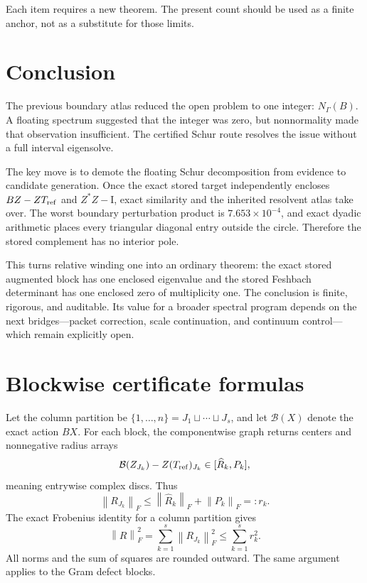\documentclass[11pt]{article}
\theoremstyle{definition}
\theoremstyle{remark}
\newcommand{\Id}{\mathrm I}
\newcommand{\norm}[1]{\left\lVert#1\right\rVert}
\newcommand{\Tref}{T_{\rm ref}}
\begin{document}
Each item requires a new theorem.  The present count should be used as a
finite anchor, not as a substitute for those limits.

\section{Conclusion}
\label{sec:conclusion}

The previous boundary atlas reduced the open problem to one integer:
\(N_\Gamma(B)\).  A floating spectrum suggested that the integer was zero,
but nonnormality made that observation insufficient.  The certified Schur
route resolves the issue without a full interval eigensolve.

The key move is to demote the floating Schur decomposition from evidence to
candidate generation.  Once the exact stored target independently encloses
\(BZ-Z\Tref\) and \(Z^*Z-\Id\), exact similarity and the inherited resolvent
atlas take over.  The worst boundary perturbation product is
\(7.653\times10^{-4}\), and exact dyadic arithmetic places every triangular
diagonal entry outside the circle.  Therefore the stored complement has no
interior pole.

This turns relative winding one into an ordinary theorem:
the exact stored augmented block has one enclosed eigenvalue and the stored
Feshbach determinant has one enclosed zero of multiplicity one.  The
conclusion is finite, rigorous, and auditable.  Its value for a broader
spectral program depends on the next bridges---packet correction, scale
continuation, and continuum control---which remain explicitly open.

\appendix

\section{Blockwise certificate formulas}
\label{app:blockwise}

Let the column partition be
\(\{1,\ldots,n\}=J_1\sqcup\cdots\sqcup J_s\), and let
\(\mathcal B(X)\) denote the exact action \(BX\).  For each block, the
componentwise graph returns centers and nonnegative radius arrays
\[
 \mathcal B(Z_{J_k})-Z(\Tref)_{J_k}
 \in [\widehat R_k,P_k],
\]
meaning entrywise complex discs.  Thus
\[
 \norm{R_{J_k}}_F
 \leq \norm{\widehat R_k}_F+\norm{P_k}_F=:r_k.
\]
The exact Frobenius identity for a column partition gives
\[
 \norm{R}_F^2=\sum_{k=1}^s\norm{R_{J_k}}_F^2
 \leq\sum_{k=1}^s r_k^2.
\]
All norms and the sum of squares are rounded outward.  The same argument
applies to the Gram defect blocks.
\end{document}
